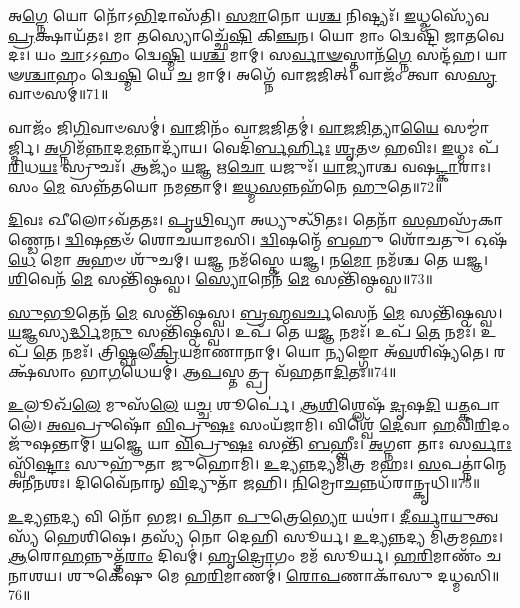 𑌅\-\ul{𑌗𑍍𑌨𑍇} 𑌯𑍋 𑌨𑍋᳴\-𑌽\-\ul{𑌭𑌿}\-𑌦𑌾𑌸᳴𑌤𑌿।
\-\ul{𑌸}\-\-\ul{𑌮𑌾}\-𑌨𑍋 𑌯\-\ul{𑌶𑍍𑌚} 𑌨𑌿𑌷𑍍𑌟𑍍𑌯𑌃᳴।
\-\ul{𑌇}\-𑌧𑍍𑌮𑌸𑍍𑌯𑍇᳴𑌵 \ul{𑌪𑍍𑌰}\-𑌕𑍍𑌷𑌾𑌯᳴𑌤𑌃।
𑌮𑌾 𑌤𑌸𑍍𑌯𑍋𑌚𑍍𑌛𑍇᳴\-\ul{𑌷𑌿} 𑌕𑌿\-\ul{𑌞𑍍𑌚}\-𑌨।
𑌯𑍋 𑌮𑌾𑌂 𑌦𑍍𑌵𑍇𑌷𑍍𑌟𑌿᳴ 𑌜𑌾𑌤𑌵𑍇𑌦𑌃।
𑌯𑌂 \ul{𑌚𑌾}\-𑌽𑌽𑌹𑌂 𑌦𑍍𑌵𑍇\-\ul{𑌷𑍍𑌮𑌿} 𑌯\-\ul{𑌶𑍍𑌚} 𑌮𑌾𑌮𑍍।
𑌸\-\ul{𑌰𑍍𑌵𑌾}\-\-\ul{𑍟}\-𑌸𑍍𑌤𑌾𑌨᳴\-\ul{𑌗𑍍𑌨𑍇} 𑌸𑌨𑍍𑌦᳴𑌹।
𑌯𑌾𑍟\-\ul{𑌶𑍍𑌚𑌾}\-𑌹𑌂 𑌦𑍍𑌵𑍇\-\ul{𑌷𑍍𑌮𑌿} 𑌯𑍇 \ul{𑌚} 𑌮𑌾𑌮𑍍।
𑌅𑌗𑍍𑌨𑍇᳴ 𑌵𑌾𑌜𑌜𑌿𑌤𑍍।
𑌵𑌾𑌜𑌂᳴ 𑌤𑍍𑌵𑌾 𑌸\-\ul{𑌸𑍃}\-𑌵𑌾𑍞𑌸𑌮𑍍॑॥71॥

𑌵𑌾𑌜𑌂᳴ 𑌜𑌿\-\ul{𑌗𑌿}\-𑌵𑌾𑍞𑌸𑌮𑍍॑।
\-\ul{𑌵𑌾}\-𑌜𑌿𑌨𑌂᳴ 𑌵𑌾\-\ul{𑌜}\-𑌜𑌿𑌤𑌮𑍍॑।
\-\ul{𑌵𑌾}\-\-\ul{𑌜}\-\-\ul{𑌜𑌿}\-𑌤𑍍𑌯𑌾\-\ul{𑌯𑍈} 𑌸𑌮𑍍𑌮𑌾॑𑌰𑍍𑌜𑍍𑌮𑌿।
\-\ul{𑌅}\-𑌗𑍍𑌨𑌿𑌮᳴\-\ul{𑌨𑍍𑌨𑌾}\-𑌦\-\ul{𑌮}\-𑌨𑍍𑌨𑌾𑌦𑍍𑌯𑌾᳴𑌯।
𑌵𑍇𑌦𑌿᳴\-\ul{𑌰𑍍𑌬}\-\-\ul{𑌰𑍍}\-𑌹𑌿𑌃 \ul{𑌶𑍃}\-𑌤𑍞 \ul{𑌹}\-𑌵𑌿𑌃।
\-\ul{𑌇}\-𑌧𑍍𑌮𑌃 𑌪᳴\-\ul{𑌰𑌿}\-𑌧\-\ul{𑌯𑌃} 𑌸𑍍𑌰𑍁𑌚𑌃᳴।
𑌆𑌜𑍍𑌯𑌂᳴ \ul{𑌯}\-𑌜𑍍𑌞 𑌋\-\ul{𑌚𑍋} 𑌯𑌜𑍁𑌃᳴।
\-\ul{𑌯𑌾}\-𑌜𑍍𑌯𑌾॑𑌶𑍍𑌚 𑌵𑌷\-\ul{𑌟𑍍𑌕𑌾}\-𑌰𑌾𑌃।
𑌸𑌂 \ul{𑌮𑍇} 𑌸𑌨𑍍𑌨᳴𑌤𑌯𑍋 𑌨𑌮𑌨𑍍𑌤𑌾𑌮𑍍।
\-\ul{𑌇}\-\-\ul{𑌧𑍍𑌮}\-\-\ul{𑌸}\-𑌨𑍍𑌨𑌹᳴𑌨𑍇 \ul{𑌹𑍁}\-𑌤𑍇॥72॥

\-\ul{𑌦𑌿}\-𑌵𑌃 𑌖𑍀𑌲𑍋\-𑌽𑌵᳴𑌤𑌤𑌃।
\-\ul{𑌪𑍃}\-\-\ul{𑌥𑌿}\-𑌵𑍍𑌯𑌾 𑌅𑌧𑍍𑌯𑍁𑌤𑍍𑌥𑌿᳴𑌤𑌃।
𑌤𑍇𑌨𑌾᳴ \ul{𑌸}\-𑌹𑌸𑍍𑌰᳴𑌕𑌾𑌣𑍍𑌡𑍇𑌨।
\-\ul{𑌦𑍍𑌵𑌿}\-𑌷𑌨𑍍𑌤𑍞᳴ 𑌶𑍋𑌚𑌯𑌾𑌮𑌸𑌿।
\-\ul{𑌦𑍍𑌵𑌿}\-𑌷𑌨𑍍𑌮𑍇᳴ \ul{𑌬}\-𑌹𑍁 𑌶𑍋᳴𑌚𑌤𑍁।
𑌓𑌷᳴\-\ul{𑌧𑍇} 𑌮𑍋 \ul{𑌅}\-𑌹𑍞 𑌶𑍁᳴𑌚𑌮𑍍।
𑌯\-\ul{𑌜𑍍𑌞} 𑌨𑌮᳴𑌸𑍍𑌤𑍇 𑌯𑌜𑍍𑌞।
𑌨\-\ul{𑌮𑍋} 𑌨𑌮᳴𑌶𑍍𑌚 𑌤𑍇 𑌯𑌜𑍍𑌞।
\-\ul{𑌶𑌿}\-𑌵𑍇𑌨᳴ \ul{𑌮𑍇} 𑌸𑌨𑍍𑌤𑌿᳴𑌷𑍍𑌠𑌸𑍍𑌵।
\-\ul{𑌸𑍍𑌯𑍋}\-𑌨𑍇𑌨᳴ \ul{𑌮𑍇} 𑌸𑌨𑍍𑌤𑌿᳴𑌷𑍍𑌠𑌸𑍍𑌵॥73॥

\-\ul{𑌸𑍁}\-\-\ul{𑌭𑍂}\-𑌤𑍇𑌨᳴ \ul{𑌮𑍇} 𑌸𑌨𑍍𑌤𑌿᳴𑌷𑍍𑌠𑌸𑍍𑌵।
\-\ul{𑌬𑍍𑌰}\-\-\ul{𑌹𑍍𑌮}\-\-\ul{𑌵}\-\-\ul{𑌰𑍍𑌚}\-𑌸𑍇𑌨᳴ \ul{𑌮𑍇} 𑌸𑌨𑍍𑌤𑌿᳴𑌷𑍍𑌠𑌸𑍍𑌵।
\-\ul{𑌯}\-𑌜𑍍𑌞𑌸𑍍𑌯\-\ul{𑌰𑍍𑌦𑍍𑌧𑌿}\-𑌮\-\ul{𑌨𑍁} 𑌸𑌨𑍍𑌤𑌿᳴𑌷𑍍𑌠𑌸𑍍𑌵।
𑌉𑌪᳴ 𑌤𑍇 𑌯\-\ul{𑌜𑍍𑌞} 𑌨𑌮𑌃᳴।
𑌉𑌪᳴ \ul{𑌤𑍇} 𑌨𑌮𑌃᳴।
𑌉𑌪᳴ \ul{𑌤𑍇} 𑌨𑌮𑌃᳴।
𑌤𑍍𑌰𑌿\-\ul{𑌷𑍍𑌫}\-𑌲𑍀\-\ul{𑌕𑍍𑌰𑌿}\-𑌯𑌮𑌾᳴𑌣𑌾𑌨𑌾𑌮𑍍।
𑌯𑍋 \ul{𑌨𑍍𑌯}\-𑌙𑍍𑌗𑍋 𑌅᳴\-\ul{𑌵}\-𑌶𑌿𑌷𑍍𑌯᳴𑌤𑍇।
𑌰𑌕𑍍𑌷᳴𑌸𑌾𑌂 𑌭𑌾\-\ul{𑌗}\-𑌧𑍇𑌯𑌮𑍍॑।
𑌆\-\ul{𑌪}\-𑌸𑍍𑌤𑌤𑍍𑌪𑍍𑌰 𑌵᳴𑌹𑌤𑌾\-\ul{𑌦𑌿}\-𑌤𑌃॥74॥

\-\ul{𑌉}\-𑌲𑍂𑌖᳴\-\ul{𑌲𑍇} 𑌮𑍁𑌸᳴\-\ul{𑌲𑍇} 𑌯\-\ul{𑌚𑍍𑌚} 𑌶𑍂𑌰𑍍𑌪𑍇॑।
\-\ul{𑌆}\-\-\ul{𑌶𑌿}\-𑌶𑍍𑌲𑍇𑌷᳴ \ul{𑌦𑍃}\-𑌷\-\ul{𑌦𑌿} 𑌯\-\ul{𑌤𑍍𑌕}\-𑌪𑌾𑌲𑍇॑।
\-\ul{𑌅}\-\-\ul{𑌵}\-𑌪𑍍𑌰𑍁𑌷𑍋᳴ \ul{𑌵𑌿}\-𑌪𑍍𑌰𑍁\-\ul{𑌷𑌃} 𑌸𑌂𑌯᳴𑌜𑌾𑌮𑌿।
𑌵𑌿𑌶𑍍𑌵𑍇᳴ \ul{𑌦𑍇}\-𑌵𑌾 \ul{𑌹}\-𑌵𑌿\-\ul{𑌰𑌿}\-𑌦𑌂 𑌜𑍁᳴𑌷𑌨𑍍𑌤𑌾𑌮𑍍।
\-\ul{𑌯}\-𑌜𑍍𑌞𑍇 𑌯𑌾 \ul{𑌵𑌿}\-𑌪𑍍𑌰𑍁\-\ul{𑌷𑌃} 𑌸𑌨𑍍𑌤𑌿᳴ \ul{𑌬}\-𑌹𑍍𑌵𑍀𑌃।
\-\ul{𑌅}\-𑌗𑍍𑌨𑍗 𑌤𑌾𑌃 𑌸\-\ul{𑌰𑍍𑌵𑌾𑌃} 𑌸𑍍𑌵𑌿᳴\-\ul{𑌷𑍍𑌟𑌾𑌃} 𑌸𑍁𑌹𑍁᳴𑌤𑌾 𑌜𑍁𑌹𑍋𑌮𑌿।
\-\ul{𑌉}\-𑌦𑍍𑌯\-\ul{𑌨𑍍𑌨}\-𑌦𑍍𑌯𑌮𑌿᳴𑌤𑍍𑌰 𑌮𑌹𑌃।
\-\ul{𑌸}\-𑌪𑌤𑍍𑌨𑌾॑𑌨𑍍𑌮𑍇 𑌅𑌨𑍀𑌨𑌶𑌃।
𑌦𑌿𑌵𑍈᳴𑌨𑌾𑌨𑍍 \ul{𑌵𑌿}\-𑌦𑍍𑌯𑍁𑌤𑌾᳴ 𑌜𑌹𑌿।
\-\ul{𑌨𑌿}\-𑌮𑍍𑌰𑍋\-\ul{𑌚}\-𑌨𑍍𑌨𑌧᳴𑌰𑌾𑌨𑍍𑌕𑍃𑌧𑌿॥75॥

\-\ul{𑌉}\-𑌦𑍍𑌯\-\ul{𑌨𑍍𑌨}\-𑌦𑍍𑌯 𑌵𑌿 𑌨𑍋᳴ 𑌭𑌜।
\-\ul{𑌪𑌿}\-𑌤𑌾 \ul{𑌪𑍁}\-𑌤𑍍𑌰𑍇\-\ul{𑌭𑍍𑌯𑍋} 𑌯𑌥𑌾॑।
\-\ul{𑌦𑍀}\-\-\ul{𑌰𑍍𑌘𑌾}\-\-\ul{𑌯𑍁}\-𑌤𑍍𑌵𑌸𑍍𑌯᳴ 𑌹𑍇𑌶𑌿𑌷𑍇।
𑌤𑌸𑍍𑌯᳴ 𑌨𑍋 𑌦𑍇𑌹𑌿 𑌸𑍂𑌰𑍍𑌯।
\-\ul{𑌉}\-𑌦𑍍𑌯\-\ul{𑌨𑍍𑌨}\-𑌦𑍍𑌯 𑌮𑌿᳴𑌤𑍍𑌰𑌮𑌹𑌃।
\-\ul{𑌆}\-𑌰𑍋\-\ul{𑌹}\-𑌨𑍍𑌨𑍁𑌤𑍍𑌤᳴\-\ul{𑌰𑌾𑌂} 𑌦𑌿𑌵𑌮𑍍॑।
\-\ul{𑌹𑍃}\-\-\ul{𑌦𑍍𑌰𑍋}\-𑌗𑌂 𑌮𑌮᳴ 𑌸𑍂𑌰𑍍𑌯।
\-\ul{𑌹}\-\-\ul{𑌰𑌿}\-𑌮𑌾𑌣𑌂᳴ 𑌚 𑌨𑌾𑌶𑌯।
𑌶𑍁𑌕𑍇᳴𑌷𑍁 𑌮𑍇 𑌹\-\ul{𑌰𑌿}\-𑌮𑌾𑌣𑌮𑍍॑।
\-\ul{𑌰𑍋}\-\-\ul{𑌪}\-𑌣𑌾𑌕𑌾᳴𑌸𑍁 𑌦𑌧𑍍𑌮𑌸𑌿॥76॥

